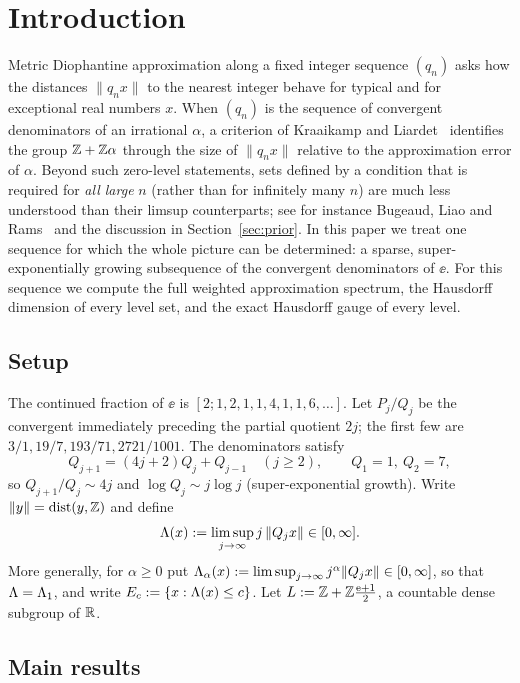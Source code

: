 \section{Introduction}

Metric Diophantine approximation along a fixed integer sequence $(q_n)$ asks
how the distances $\|q_nx\|$ to the nearest integer behave for typical and for
exceptional real numbers $x$. When $(q_n)$ is the sequence of convergent
denominators of an irrational $\alpha$, a criterion of Kraaikamp and
Liardet~\cite{KL} identifies the group $\mathbb{Z}+\mathbb{Z}\alpha$ through the size of
$\|q_nx\|$ relative to the approximation error of $\alpha$. Beyond such
zero-level statements, sets defined by a condition that is required for
\emph{all large} $n$ (rather than for infinitely many $n$) are much less
understood than their limsup counterparts; see for instance
Bugeaud, Liao and Rams~\cite{BLR} and the discussion in
Section~\ref{sec:prior}. In this paper we treat one sequence for which the
whole picture can be determined: a sparse, super-exponentially growing
subsequence of the convergent denominators of $\ee$. For this sequence we
compute the full weighted approximation spectrum, the Hausdorff dimension of
every level set, and the exact Hausdorff gauge of every level.

\subsection{Setup}

The continued fraction of $\ee$ is $[2;1,2,1,1,4,1,1,6,\dots]$. Let $P_j/Q_j$
be the convergent immediately preceding the partial quotient $2j$; the first
few are $3/1,19/7,193/71,2721/1001$. The denominators satisfy
\begin{equation}\label{eq:rec}
Q_{j+1}=(4j+2)Q_j+Q_{j-1}\quad(j\ge2),\qquad Q_1=1,\ Q_2=7,
\end{equation}
so $Q_{j+1}/Q_j\sim 4j$ and $\log Q_j\sim j\log j$ (super-exponential growth).
Write $\|y\|=\operatorname{dist}(y,\mathbb{Z})$ and define
\[
\Lambda(x):=\limsup_{j\to\infty} j\,\|Q_j x\|\in[0,\infty].
\]
More generally, for $\alpha\ge0$ put
$\Lambda_\alpha(x):=\limsup_{j\to\infty} j^\alpha\|Q_j x\|\in[0,\infty]$,
so that $\Lambda=\Lambda_1$, and write $E_c:=\{x:\Lambda(x)\le c\}$.
Let $L:=\mathbb{Z}+\mathbb{Z}\frac{\mathrm{e}+1}{2}$, a countable dense subgroup of $\mathbb{R}$.

\subsection{Main results}

